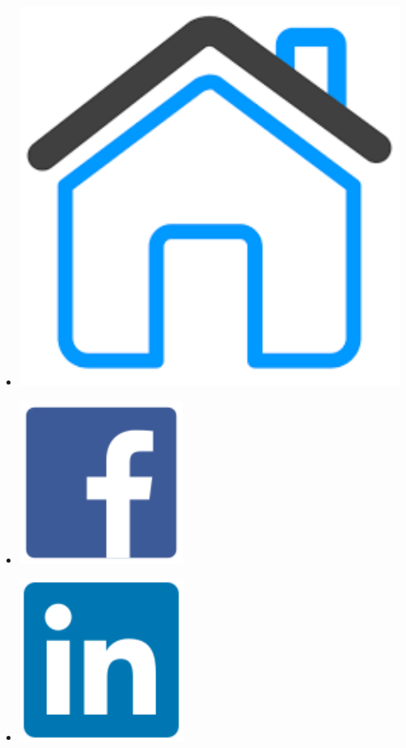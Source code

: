 \documentclass[a4paper,oneside,11pt]{article}
\begin{document}
\begin{multicols}{9}
\begin{itemize}

\item[]\href{https://iosang.github.io}{\includegraphics[scale=0.08]{assets/home.pdf}}

\item[]\href{https://www.facebook.com/metimdjai}{\includegraphics[scale=0.2]{assets/facebook-original.pdf}}

\item[]\href{https://www.linkedin.com/in/iosif-angelidis/}{\includegraphics[scale=0.2]{assets/linkedin-original.pdf}}


\end{itemize}
\end{multicols}
\end{document}
